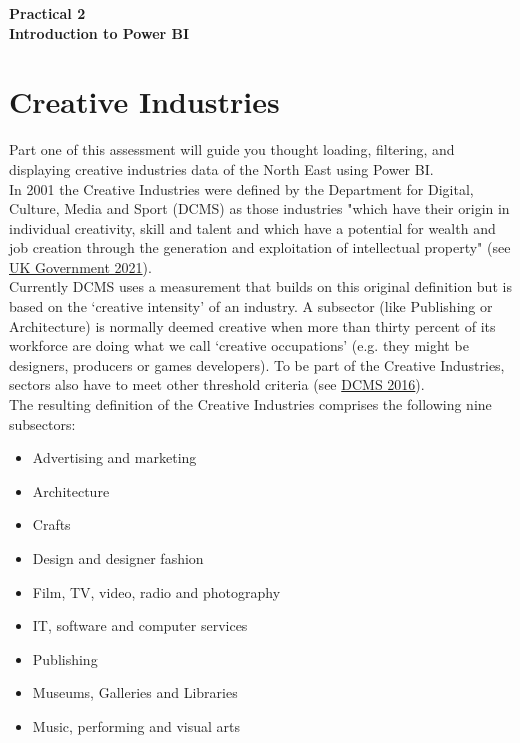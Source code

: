\documentclass[11pt]{article}
\begin{document}
\pagestyle{fancy}
\renewcommand{\headrulewidth}{0pt}
\fancyfoot[L]{\thepage}
\fancyfoot[C]{}

\begin{center}
\vspace*{1cm}
{\textbf {\Huge Practical 2}}\\
\vspace*{0.5cm}
{\textbf {\huge Introduction to Power BI}}
\vspace*{1cm}
\end{center}

\section{Creative Industries}

Part one of this assessment will guide you thought loading, filtering, and displaying creative industries data of the North East using Power BI.\\

In 2001 the Creative Industries were defined by the Department for Digital, Culture, Media and Sport (DCMS) as those industries "which have their origin in individual creativity, skill and talent and which have a potential for wealth and job creation through the generation and exploitation of intellectual property" (see \href{https://www.gov.uk/government/publications/dcms-sectors-economic-estimates-methodology}{UK Government 2021}).\\

Currently DCMS uses a measurement that builds on this original definition but is based on the ‘creative intensity’ of an industry. A subsector (like Publishing or Architecture) is normally deemed creative when more than thirty percent of its workforce are doing what we call ‘creative occupations’ (e.g. they might be designers, producers or games developers). To be part of the Creative Industries, sectors also have to meet other threshold criteria (see \href{https://assets.publishing.service.gov.uk/government/uploads/system/uploads/attachment_data/file/499683/CIEE_Methodology.pdf}{DCMS 2016}).\\

The resulting definition of the Creative Industries comprises the following nine subsectors:

\begin{itemize}
    \itemsep0em 
    \item  Advertising and marketing
    \item  Architecture
    \item  Crafts
    \item  Design and designer fashion
    \item  Film, TV, video, radio and photography
    \item  IT, software and computer services
    \item  Publishing
    \item  Museums, Galleries and Libraries
    \item  Music, performing and visual arts
\end{itemize}
\end{document}
